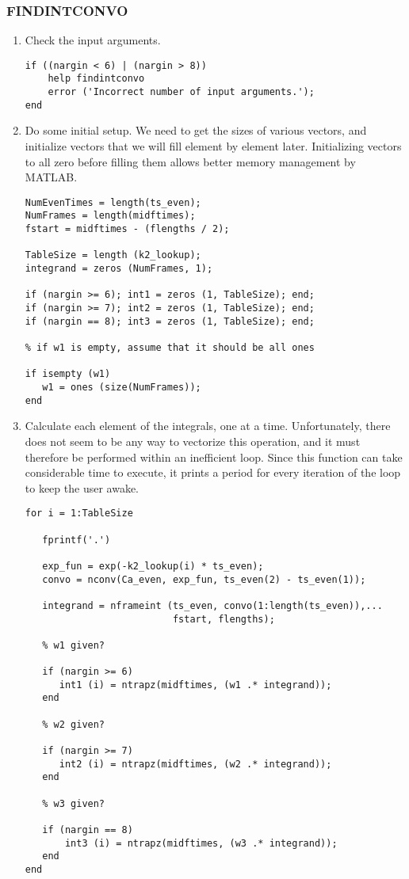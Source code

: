 \subsubsection{FINDINTCONVO}
\label{sec:findintconvo_listing}
\begin{enumerate}
\item Check the input arguments.
\begin{verbatim}
if ((nargin < 6) | (nargin > 8))
    help findintconvo
    error ('Incorrect number of input arguments.');
end
\end{verbatim}

\item Do some initial setup.  We need to get the sizes of various
vectors, and initialize vectors that we will fill element by element
later.  Initializing vectors to all zero before filling them allows
better memory management by MATLAB.
\begin{verbatim}
NumEvenTimes = length(ts_even);
NumFrames = length(midftimes);
fstart = midftimes - (flengths / 2);

TableSize = length (k2_lookup);
integrand = zeros (NumFrames, 1);

if (nargin >= 6); int1 = zeros (1, TableSize); end;
if (nargin >= 7); int2 = zeros (1, TableSize); end;
if (nargin == 8); int3 = zeros (1, TableSize); end;

% if w1 is empty, assume that it should be all ones

if isempty (w1)
   w1 = ones (size(NumFrames));
end
\end{verbatim}

\item Calculate each element of the integrals, one at a time.
Unfortunately, there does not seem to be any way to vectorize this
operation, and it must therefore be performed within an inefficient
 loop.  Since this function can take considerable time to
execute, it prints a period for every iteration of the loop to keep
the user awake.

\begin{verbatim}
for i = 1:TableSize

   fprintf('.')

   exp_fun = exp(-k2_lookup(i) * ts_even);
   convo = nconv(Ca_even, exp_fun, ts_even(2) - ts_even(1));

   integrand = nframeint (ts_even, convo(1:length(ts_even)),...
                          fstart, flengths);

   % w1 given?

   if (nargin >= 6)
      int1 (i) = ntrapz(midftimes, (w1 .* integrand));
   end
   
   % w2 given?

   if (nargin >= 7)
      int2 (i) = ntrapz(midftimes, (w2 .* integrand));
   end

   % w3 given?
   
   if (nargin == 8)
       int3 (i) = ntrapz(midftimes, (w3 .* integrand));
   end
end
\end{verbatim}
\end{enumerate}


